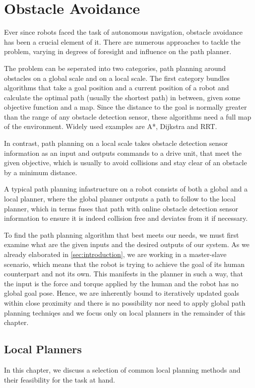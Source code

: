 \chapter{Obstacle Avoidance}
Ever since robots faced the task of autonomous navigation, obstacle avoidance has been a crucial element of it. There are numerous approaches to tackle the problem, varying in degrees of foresight and influence on the path planner.

The problem can be seperated into two categories, path planning around obstacles on a global scale and on a local scale. The first category bundles algorithms that take a goal position and a current position of a robot and calculate the optimal path (usually the shortest path) in between, given some objective function and a map. Since the distance to the goal is normally greater than the range of any obstacle detection sensor, these algorithms need a full map of the environment. Widely used examples are A*, Dijkstra and RRT.

In contrast, path planning on a local scale takes obstacle detection sensor information as an input and outputs commands to a drive unit, that meet the given objective, which is usually to avoid collisions and stay clear of an obstacle by a minimum distance. 

A typical path planning infastructure on a robot consists of both a global and a local planner, where the global planner outputs a path to follow to the local planner, which in terms fuses that path with online obstacle detection sensor information to ensure it is indeed collision free and deviates from it if necessary.

To find the path planning algorithm that best meets our needs, we must first examine what are the given inputs and the desired outputs of our system. As we already elaborated in \cref{sec:introduction}, we are working in a master-slave scenario, which means that the robot is trying to achieve the goal of its human counterpart and not its own. This manifests in the planner in such a way, that the input is the force and torque applied by the human and the robot has no global goal pose. Hence, we are inherently bound to iteratively updated goals within close proximity and there is no possibility nor need to apply global path planning techniqes and we focus only on local planners in the remainder of this chapter.

\section{Local Planners}
In this chapter, we discuss a selection of common local planning methods and their feasibility for the task at hand.

